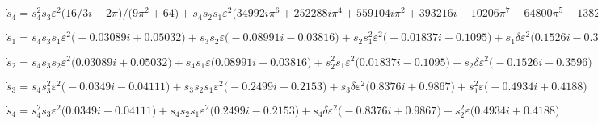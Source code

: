 \documentclass[11pt,a5paper]{article}
\def\eps{\varepsilon}
\begin{document}
\(\dot s_{4}=s_{4}^{2} s_{3} \eps^{2} \big(16/3 i-2 \pi \big)/\big(9 \pi 
^{2}+64\big)+s_{4} s_{2} s_{1} \eps^{2} \big(34992 i \pi ^{6}+252288 i 
\pi ^{4}+559104 i \pi ^{2}+393216 i-10206 \pi ^{7}-64800 \pi ^{5}-138240
 \pi ^{3}-98304 \pi \big)/\big(6561 \pi ^{8}+116640 \pi ^{6}+684288 \pi 
^{4}+1474560 \pi ^{2}+1048576\big)+s_{4} \delta  \eps^{2} \big(-128 i+48
 \pi \big)/\big(9 \pi ^{2}+64\big)+s_{2}^{2} \eps \big(24 i \pi +64\big)
/\big(9 \pi ^{2}+64\big)
\)\par

\(\dot s_{1}=s_{4} s_{3} s_{1} \eps^{2} \big(-0.03089 i+0.05032\big)+s
_{3} s_{2} \eps \big(-0.08991 i-0.03816\big)+s_{2} s_{1}^{2} \eps^{2
} \big(-0.01837 i-0.1095\big)+s_{1} \delta  \eps^{2} \big(0.1526 i
-0.3596\big)
\)\par

\(\dot s_{2}=s_{4} s_{3} s_{2} \eps^{2} \big(0.03089 i+0.05032\big)+s_
{4} s_{1} \eps \big(0.08991 i-0.03816\big)+s_{2}^{2} s_{1} \eps^{2} 
\big(0.01837 i-0.1095\big)+s_{2} \delta  \eps^{2} \big(-0.1526 i-
0.3596\big)
\)\par

\(\dot s_{3}=s_{4} s_{3}^{2} \eps^{2} \big(-0.0349 i-0.04111\big)+s_{3
} s_{2} s_{1} \eps^{2} \big(-0.2499 i-0.2153\big)+s_{3} \delta  \eps
^{2} \big(0.8376 i+0.9867\big)+s_{1}^{2} \eps \big(-0.4934 i+
0.4188\big)
\)\par

\(\dot s_{4}=s_{4}^{2} s_{3} \eps^{2} \big(0.0349 i-0.04111\big)+s_{4}
 s_{2} s_{1} \eps^{2} \big(0.2499 i-0.2153\big)+s_{4} \delta  \eps^{
2} \big(-0.8376 i+0.9867\big)+s_{2}^{2} \eps \big(0.4934 i+
0.4188\big)
\)\par
\end{document}
